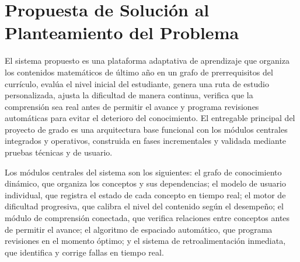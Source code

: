 \documentclass{univalle-perfil}
\begin{document}
\section{Propuesta de Solución al Planteamiento del Problema}

El sistema propuesto es una plataforma adaptativa de aprendizaje que organiza los contenidos matemáticos de último año en un grafo de prerrequisitos del currículo, evalúa el nivel inicial del estudiante, genera una ruta de estudio personalizada, ajusta la dificultad de manera continua, verifica que la comprensión sea real antes de permitir el avance y programa revisiones automáticas para evitar el deterioro del conocimiento. El entregable principal del proyecto de grado es una arquitectura base funcional con los módulos centrales integrados y operativos, construida en fases incrementales y validada mediante pruebas técnicas y de usuario.

Los módulos centrales del sistema son los siguientes: el grafo de conocimiento dinámico, que organiza los conceptos y sus dependencias; el modelo de usuario individual, que registra el estado de cada concepto en tiempo real; el motor de dificultad progresiva, que calibra el nivel del contenido según el desempeño; el módulo de comprensión conectada, que verifica relaciones entre conceptos antes de permitir el avance; el algoritmo de espaciado automático, que programa revisiones en el momento óptimo; y el sistema de retroalimentación inmediata, que identifica y corrige fallas en tiempo real.
\end{document}
